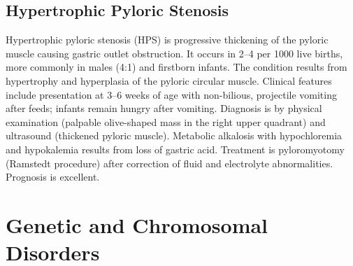 \subsection{Hypertrophic Pyloric Stenosis}
\label{sec:Hypertrophic Pyloric Stenosis}
Hypertrophic pyloric stenosis (HPS) is progressive thickening of the pyloric muscle causing gastric outlet obstruction. It occurs in 2--4 per 1000 live births, more commonly in males (4:1) and firstborn infants. The condition results from hypertrophy and hyperplasia of the pyloric circular muscle. Clinical features include presentation at 3--6 weeks of age with non-bilious, projectile vomiting after feeds; infants remain hungry after vomiting. Diagnosis is by physical examination (palpable olive-shaped mass in the right upper quadrant) and ultrasound (thickened pyloric muscle). Metabolic alkalosis with hypochloremia and hypokalemia results from loss of gastric acid. Treatment is pyloromyotomy (Ramstedt procedure) after correction of fluid and electrolyte abnormalities. Prognosis is excellent.

\section{Genetic and Chromosomal Disorders}








\label{sec:Genetic and Chromosomal Disorders}

